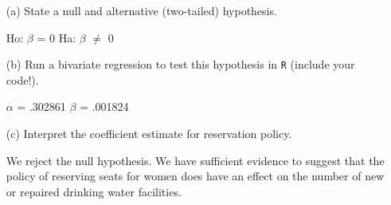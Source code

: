 \documentclass[12pt,letterpaper]{article}
\begin{document}
\begin{enumerate}
	\newpage
	\item [(a)] State a null and alternative (two-tailed) hypothesis. 
	
	\noindent Ho: $\beta$ = 0 Ha: $\beta$ $\neq$ 0
	\vspace{6cm}
	\item [(b)] Run a bivariate regression to test this hypothesis in \texttt{R} (include your code!).
	
	\noindent $\alpha$ = .302861  $\beta$ = .001824
	
	
 
	\vspace{6cm}
	\item [(c)] Interpret the coefficient estimate for reservation policy. 
	
	\noindent We reject the null hypothesis. We have sufficient evidence to suggest that the policy of reserving seats for women does have an effect on the number of new or repaired drinking water facilities. 
\end{enumerate}
\end{document}
